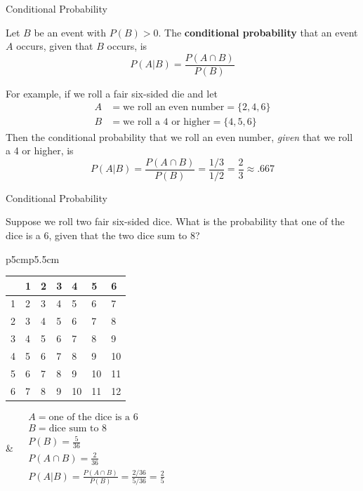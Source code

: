 \documentclass[xcolor=table]{beamer}
\renewcommand{\emph}{\textbf}
\begin{document}
\begin{frame}{Conditional Probability}
\begin{definition}
Let $B$ be an event with $P(B)>0$. The \emph{conditional probability} that an event $A$ occurs, given that $B$ occurs, is
$$P(A|B)=\frac{P(A\cap B)}{P(B)}$$
\end{definition}

For example, if we roll a fair six-sided die and let
\begin{align*}
A &= \text{we roll an even number} = \{2,4,6\}\\
B &= \text{we roll a 4 or higher} =\{4,5,6\}
\end{align*}
Then the conditional probability that we roll an even number, \textit{given} that we roll a 4 or higher, is
$$P(A|B) = \frac{P(A\cap B)}{P(B)} = \frac{1/3}{1/2} = \frac23 \approx .667$$
\end{frame}

\begin{frame}{Conditional Probability}
\begin{problem}
Suppose we roll two fair six-sided dice. What is the probability that one of the dice is a 6, given that the two dice sum to 8?
\end{problem}

\pause\begin{center}
\begin{tabular}{p{5cm}p{5.5cm}}
\begin{tabular}{l||p{.3cm}|p{.3cm}|p{.3cm}|p{.3cm}|p{.3cm}|p{.3cm}|}
& 1 & 2 & 3 & 4 & 5 & 6 \\ \hline \hline
1& 2 & 3 & 4 & 5 & 6 & 7 \\ \hline
2& 3 & 4 & 5 & 6 & 7 &  \cellcolor{cyan}8  \\ \hline
3& 4 & 5 & 6 & 7 &  \cellcolor{gray!15}8 & 9 \\ \hline
4& 5 & 6 & 7 &  \cellcolor{gray!15}8 & 9 & 10\\ \hline
5& 6 & 7 &  \cellcolor{gray!15}8 & 9 &10 & 11\\ \hline
6& 7 &  \cellcolor{cyan}8 & 9 & 10 & 11 & 12\\ \hline
\end{tabular}
&
$\begin{aligned}
&A = \text{one of the dice is a 6}\\
&B = \text{dice sum to 8}\\
&P(B) =  \frac5{36}\\
&P(A\cap B) = \frac2{36}\\
&P(A|B) = \frac{P(A\cap B)}{P(B)} = \frac{2/36}{5/36}=\frac25
\end{aligned}$
\end{tabular}
\end{center}
\end{frame}
\end{document}
